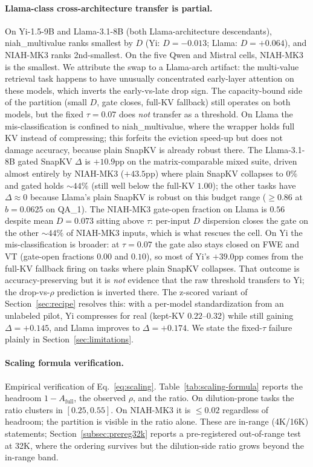 \documentclass{article}
\begin{document}
\paragraph{Llama-class cross-architecture transfer is partial.} On
Yi-1.5-9B and Llama-3.1-8B (both Llama-architecture descendants),
niah\_multivalue ranks smallest by $D$ (Yi: $D = -0.013$; Llama: $D =
+0.064$), and NIAH-MK3 ranks 2nd-smallest. On the five Qwen and
Mistral cells, NIAH-MK3 is the smallest. We attribute the swap to a
Llama-arch artifact: the multi-value retrieval task happens to have
unusually concentrated early-layer attention on these models, which
inverts the early-vs-late drop sign. The capacity-bound side of the
partition (small $D$, gate closes, full-KV fallback) still operates on
both models, but the fixed $\tau = 0.07$ does \emph{not} transfer as a
threshold. On Llama the mis-classification is confined to
niah\_multivalue, where the wrapper holds full KV instead of
compressing; this forfeits the eviction speed-up but does not damage
accuracy, because plain SnapKV is already robust there. The
Llama-3.1-8B gated SnapKV $\Delta$ is $+10.9$pp on the
matrix-comparable mixed suite, driven almost entirely by NIAH-MK3
($+43.5$pp) where plain SnapKV collapses to $0\%$ and gated holds
$\sim 44\%$ (still well below the full-KV $1.00$); the other tasks
have $\Delta \approx 0$ because Llama's plain SnapKV is robust on this
budget range ($\geq 0.86$ at $b = 0.0625$ on QA\_1). The NIAH-MK3
gate-open fraction on Llama is $0.56$ despite mean $D = 0.073$ sitting
above $\tau$: per-input $D$ dispersion closes the gate on the other
$\sim 44\%$ of NIAH-MK3 inputs, which is what rescues the cell. On Yi
the mis-classification is broader: at $\tau = 0.07$ the gate also
stays closed on FWE and VT (gate-open fractions $0.00$ and $0.10$), so
most of Yi's $+39.0$pp comes from the full-KV fallback firing on tasks
where plain SnapKV collapses. That outcome is accuracy-preserving but
it is \emph{not} evidence that the raw threshold transfers to Yi; the
drop-vs-$\rho$ prediction is inverted there. The z-scored variant of
Section~\ref{sec:recipe} resolves this: with a per-model standardization
from an unlabeled pilot, Yi compresses for real (kept-KV
$0.22$--$0.32$) while still gaining $\Delta = +0.145$, and Llama
improves to $\Delta = +0.174$. We state the fixed-$\tau$ failure
plainly in Section~\ref{sec:limitations}.

\paragraph{Scaling formula verification.}
Empirical verification of Eq.~\eqref{eq:scaling}. Table~\ref{tab:scaling-formula}
reports the headroom $1 - A_{\mathrm{full}}$, the observed $\rho$, and the
ratio. On dilution-prone tasks the ratio clusters in $[0.25, 0.55]$. On
NIAH-MK3 it is $\le 0.02$ regardless of headroom; the partition is
visible in the ratio alone. These are in-range (4K/16K) statements;
Section~\ref{subsec:prereg32k} reports a pre-registered out-of-range
test at 32K, where the ordering survives but the dilution-side ratio
grows beyond the in-range band.
\end{document}
